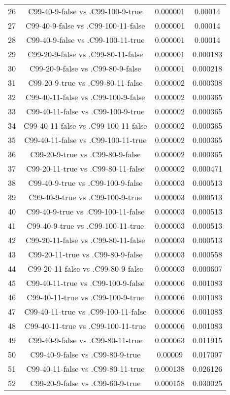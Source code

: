 \documentclass[a4paper,10pt]{article}
\begin{document}
\begin{landscape}
\begin{table}[!htp]
\begin{tabular}{cccc}
26&C99-40-9-false vs .C99-100-9-true&0.000001&0.00014\\
27&C99-40-9-false vs .C99-100-11-false&0.000001&0.00014\\
28&C99-40-9-false vs .C99-100-11-true&0.000001&0.00014\\
29&C99-20-9-false vs .C99-80-11-false&0.000001&0.000183\\
30&C99-20-9-false vs .C99-80-9-false&0.000001&0.000218\\
31&C99-20-9-true vs .C99-80-11-false&0.000002&0.000308\\
32&C99-40-11-false vs .C99-100-9-false&0.000002&0.000365\\
33&C99-40-11-false vs .C99-100-9-true&0.000002&0.000365\\
34&C99-40-11-false vs .C99-100-11-false&0.000002&0.000365\\
35&C99-40-11-false vs .C99-100-11-true&0.000002&0.000365\\
36&C99-20-9-true vs .C99-80-9-false&0.000002&0.000365\\
37&C99-20-11-true vs .C99-80-11-false&0.000002&0.000471\\
38&C99-40-9-true vs .C99-100-9-false&0.000003&0.000513\\
39&C99-40-9-true vs .C99-100-9-true&0.000003&0.000513\\
40&C99-40-9-true vs .C99-100-11-false&0.000003&0.000513\\
41&C99-40-9-true vs .C99-100-11-true&0.000003&0.000513\\
42&C99-20-11-false vs .C99-80-11-false&0.000003&0.000513\\
43&C99-20-11-true vs .C99-80-9-false&0.000003&0.000558\\
44&C99-20-11-false vs .C99-80-9-false&0.000003&0.000607\\
45&C99-40-11-true vs .C99-100-9-false&0.000006&0.001083\\
46&C99-40-11-true vs .C99-100-9-true&0.000006&0.001083\\
47&C99-40-11-true vs .C99-100-11-false&0.000006&0.001083\\
48&C99-40-11-true vs .C99-100-11-true&0.000006&0.001083\\
49&C99-40-9-false vs .C99-80-11-true&0.000063&0.011915\\
50&C99-40-9-false vs .C99-80-9-true&0.00009&0.017097\\
51&C99-40-11-false vs .C99-80-11-true&0.000138&0.026126\\
52&C99-20-9-false vs .C99-60-9-true&0.000158&0.030025\\

\end{tabular}
\end{table}
\end{landscape}
\end{document}
